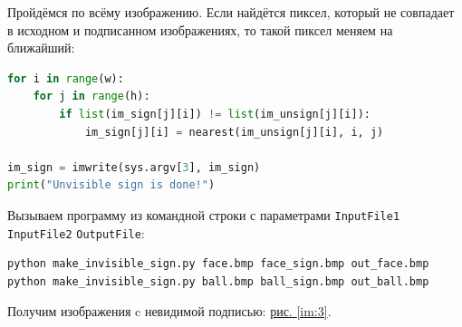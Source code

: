 \documentclass[12pt,a4paper]{scrartcl}
\begin{document}
Пройдёмся по всёму изображению. Если найдётся пиксел, который не совпадает в исходном и подписанном изображениях, то такой пиксел меняем на ближайший:
\begin{lstlisting}[language=Python]
for i in range(w):
    for j in range(h):
        if list(im_sign[j][i]) != list(im_unsign[j][i]): 
            im_sign[j][i] = nearest(im_unsign[j][i], i, j)

im_sign = imwrite(sys.argv[3], im_sign)    
print("Unvisible sign is done!")
\end{lstlisting}    
Вызываем программу из командной строки с параметрами \texttt{InputFile1} \texttt{InputFile2} \texttt{OutputFile}:
\begin{lstlisting}
python make_invisible_sign.py face.bmp face_sign.bmp out_face.bmp
python make_invisible_sign.py ball.bmp ball_sign.bmp out_ball.bmp
\end{lstlisting}
Получим изображения c невидимой подписью: \hyperref[im:3]{рис. \ref*{im:3}}.
\end{document}
